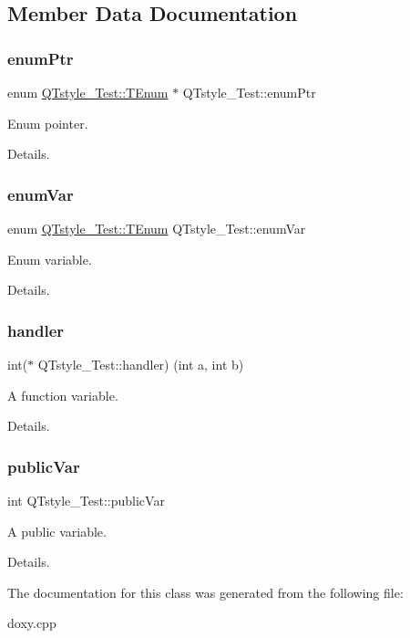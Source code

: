 \subsection{Member Data Documentation}
\mbox{\label{classQTstyle__Test_a973a4566c9a036f4eca508ba5fe80dcb}} 
\subsubsection{\texorpdfstring{enum\+Ptr}{enumPtr}}
{\footnotesize\ttfamily enum \hyperlink{classQTstyle__Test_a0525f798cda415a94fedeceb806d2c49}{Q\+Tstyle\+\_\+\+Test\+::\+T\+Enum}
         $\ast$ Q\+Tstyle\+\_\+\+Test\+::enum\+Ptr}



Enum pointer. 

Details. \mbox{\label{classQTstyle__Test_adb265d815b43f1f7f0de0e8b8852a5d0}} 
\subsubsection{\texorpdfstring{enum\+Var}{enumVar}}
{\footnotesize\ttfamily enum \hyperlink{classQTstyle__Test_a0525f798cda415a94fedeceb806d2c49}{Q\+Tstyle\+\_\+\+Test\+::\+T\+Enum}
          Q\+Tstyle\+\_\+\+Test\+::enum\+Var}



Enum variable. 

Details. \mbox{\label{classQTstyle__Test_a79dd4e5498f09057775a819d911349e2}} 
\subsubsection{\texorpdfstring{handler}{handler}}
{\footnotesize\ttfamily int($\ast$ Q\+Tstyle\+\_\+\+Test\+::handler) (int a, int b)}



A function variable. 

Details. \mbox{\label{classQTstyle__Test_aabf7b2e9ed83ea44aca4d213baae06d3}} 
\subsubsection{\texorpdfstring{public\+Var}{publicVar}}
{\footnotesize\ttfamily int Q\+Tstyle\+\_\+\+Test\+::public\+Var}



A public variable. 

Details. 

The documentation for this class was generated from the following file\+:\begin{DoxyCompactItemize}
\item 
doxy.\+cpp\end{DoxyCompactItemize}
